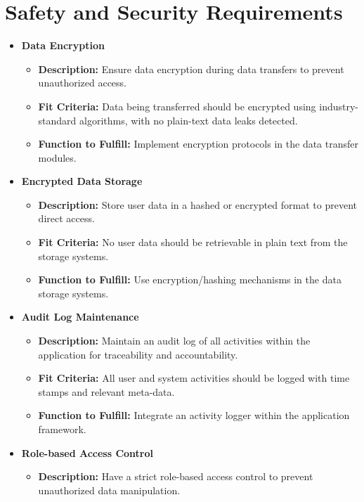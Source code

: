 \documentclass{article}
\newcounter{srnum} %
\newcommand{\rthesrnum}{SR\refstepcounter{srnum}\thesrnum:}
\begin{document}
\section{Safety and Security Requirements}
\begin{itemize}
\item [\rthesrnum \label{Data_Encryption}] \textbf{Data Encryption}
  \begin{itemize}
  \item \textbf{Description:} Ensure data encryption during data transfers to prevent unauthorized access.
  \item \textbf{Fit Criteria:} Data being transferred should be encrypted using industry-standard algorithms, with no plain-text data leaks detected.
  \item \textbf{Function to Fulfill:} Implement encryption protocols in the data transfer modules.
  \end{itemize}
\item [\rthesrnum \label{Encrypted_Data_Storage}] \textbf{Encrypted Data Storage}
  \begin{itemize}
  \item \textbf{Description:} Store user data in a hashed or encrypted format to prevent direct access.
  \item \textbf{Fit Criteria:} No user data should be retrievable in plain text from the storage systems.
  \item \textbf{Function to Fulfill:} Use encryption/hashing mechanisms in the data storage systems.
  \end{itemize}
\item [\rthesrnum \label{Audit_Log_Maintenance}] \textbf{Audit Log Maintenance}
  \begin{itemize}
  \item \textbf{Description:} Maintain an audit log of all activities within the application for traceability and accountability.
  \item \textbf{Fit Criteria:} All user and system activities should be logged with time stamps and relevant meta-data.
  \item \textbf{Function to Fulfill:} Integrate an activity logger within the application framework.
  \end{itemize}
\item [\rthesrnum \label{Role-based_Access_Control}] \textbf{Role-based Access Control}
  \begin{itemize}
  \item \textbf{Description:} Have a strict role-based access control to prevent unauthorized data manipulation.

\end{itemize}
\end{itemize}
\end{document}
